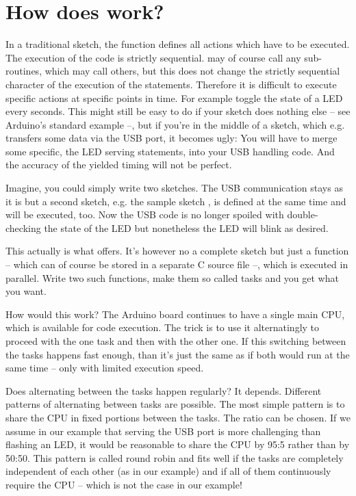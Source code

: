 \chapter{How does \rtos{} work?}
\label{secHowDoesRTuinOSWork}

In a traditional sketch, the function  defines all actions
which have to be executed. The execution of the code is strictly
sequential.  may of course call any sub-routines, which may
call others, but this does not change the strictly sequential character of
the execution of the statements. Therefore it is difficult to execute
specific actions at specific points in time. For example toggle the state
of a LED every seconds. This might still be easy to do if your sketch does
nothing else -- see Arduino's standard example  --, but if
you're in the middle of a sketch, which e.g. transfers some data via the
USB port, it becomes ugly: You will have to merge some specific, the LED
serving statements, into your USB handling code. And the accuracy of the
yielded timing will not be perfect.

Imagine, you could simply write two sketches. The USB communication stays
as it is but a second sketch, e.g. the sample sketch , is
defined at the same time and will be executed, too. Now the USB code is no
longer spoiled with double-checking the state of the LED but nonetheless
the LED will blink as desired.

This actually is what \rtos{} offers. It's however no a complete sketch
but just a function -- which can of course be stored in a separate C
source file --, which is executed in parallel. Write two such functions,
make them so called tasks and you get what you want.

How would this work? The Arduino board continues to have a single main
CPU, which is available for code execution. The trick is to use it
alternatingly to proceed with the one task and then with the other one. If
this switching between the tasks happens fast enough, than it's just the
same as if both would run at the same time -- only with limited execution
speed.

Does alternating between the tasks happen regularly? It depends. Different
patterns of alternating between tasks are possible. The most simple
pattern is to share the CPU in fixed portions between the tasks. The ratio
can be chosen. If we assume in our example that serving the USB port is
more challenging than flashing an LED, it would be reasonable to share the
CPU by 95:5 rather than by 50:50. This pattern is called round robin and
fits well if the tasks are completely independent of each other (as in our
example) and if all of them continuously require the CPU -- which is not
the case in our example!

